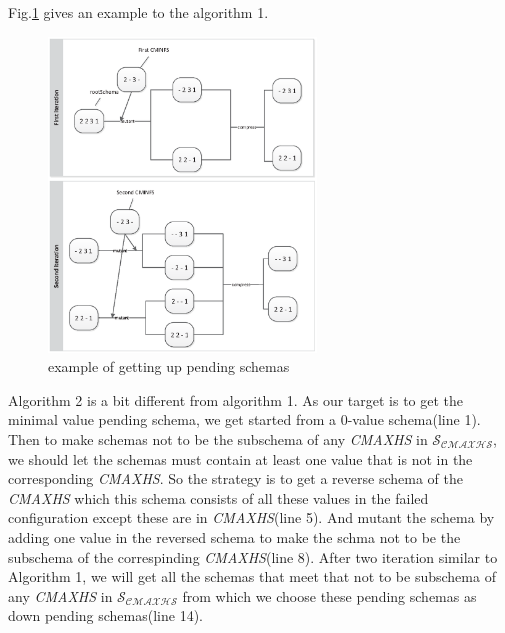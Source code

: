 \documentclass[10pt,journal,cspaper,compsoc]{IEEEtran}
\begin{document}
Fig.\ref{figch} gives an example to the algorithm 1.

\begin{figure}
 \centering
 \includegraphics[width=2.8in]{ch.eps}
 \caption{example of getting up pending schemas}
 \label{figch}
\end{figure}


Algorithm 2 is a bit different from algorithm 1. As our target is to get the minimal value pending schema, we get started from a 0-value schema(line 1). Then to make schemas not to be the subschema of any \emph{CMAXHS} in $\mathcal{S_{CMAXHS}}$, we should let the schemas must contain at least one value that is not in the corresponding \emph{CMAXHS}. So the strategy is to get a reverse schema of the \emph{CMAXHS} which this schema consists of all these values in the failed configuration except these are in \emph{CMAXHS}(line 5). And mutant the schema by adding one value in the reversed schema to make the schma not to be the subschema of the correspinding \emph{CMAXHS}(line 8). After two iteration similar to Algorithm 1, we will get all the schemas that meet that not to be  subschema of any \emph{CMAXHS} in $\mathcal{S_{CMAXHS}}$ from which we choose these pending schemas as down pending schemas(line 14).
\end{document}
